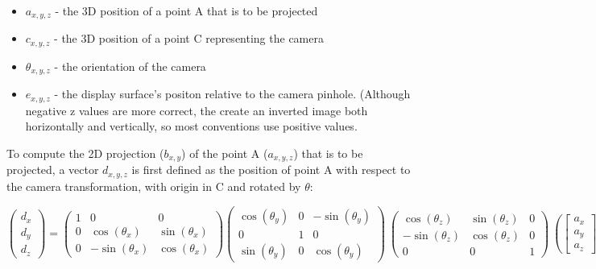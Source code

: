 \documentclass{article}
\begin{document}
\begin{itemize}
  \item $a_{x, y, z}$ - the 3D position of a point A that is to be projected
  \item $c_{x, y, z}$ - the 3D position of a point C representing the camera
  \item $\theta_{x, y, z}$ - the orientation of the camera
  \item $e_{x, y, z}$ - the display surface's positon relative to the camera pinhole. (Although negative z values are more correct, the create an inverted image both horizontally and vertically, so most conventions use positive values.
\end{itemize}

To compute the 2D projection ($b_{x, y}$) of the point A ($a_{x, y, z}$) that is to be projected, a vector $d_{x, y, z}$ is first defined as the position of point A with respect to the camera transformation, with origin in C and rotated by $\theta$:

\[\begin{pmatrix}
  d_{x} \\
  d_{y} \\
  d_{z} 
 \end{pmatrix}
=
\begin{pmatrix}
  1 & 0 & 0 \\
  0 & \cos(\theta_{x}) & \sin(\theta_{x}) \\
  0 &  -\sin(\theta_{x}) & \cos(\theta_{x}) 
 \end{pmatrix}
\begin{pmatrix}
  \cos(\theta_{y}) & 0 & -\sin(\theta_{y}) \\
  0 & 1 & 0 \\
  \sin(\theta_{y}) & 0  & \cos(\theta_{y}) 
 \end{pmatrix}\
\begin{pmatrix}
  \cos(\theta_{z}) & \sin(\theta_{z})  & 0  \\
  -\sin(\theta_{z}) & \cos(\theta_{z}) & 0 \\
  0 & 0  & 1 
 \end{pmatrix}\
\left(
\begin{bmatrix}
  a_{x} \\
  a_{y} \\
  a_{z} 
\end{bmatrix}\
-
\begin{bmatrix}
  c_{x} \\
  c_{y} \\
  c_{z} 
\end{bmatrix}\
\right)\]
\end{document}
